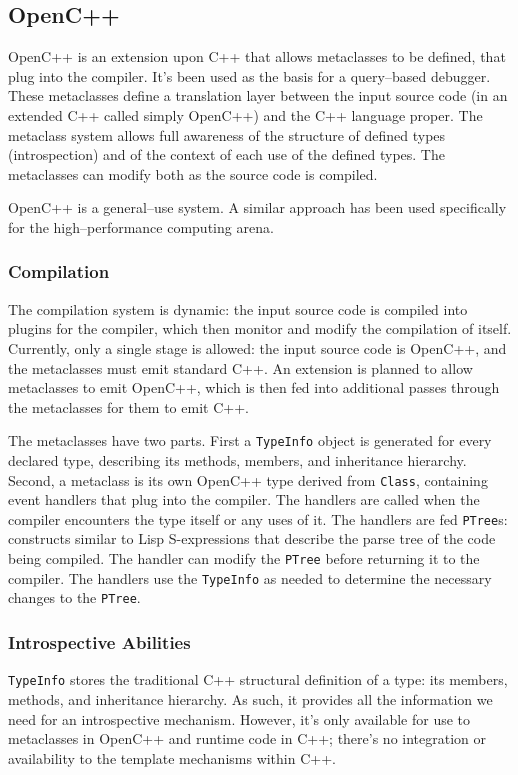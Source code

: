 \subsection{OpenC++}
	OpenC++\cite{chiba, opencpp, opencpp-tut} is an extension upon C++ that allows metaclasses to be defined, that plug into the compiler.  It's been used as the basis for a query--based debugger\cite{263752, 381750}.  These metaclasses define a translation layer between the input source code (in an extended C++ called simply OpenC++) and the C++ language proper.  The metaclass system allows full awareness of the structure of defined types (introspection) and of the context of each use of the defined types.  The metaclasses can modify both as the source code is compiled.

	OpenC++ is a general--use system.  A similar approach\cite{240738} has been used specifically for the high--performance computing arena.

	\subsubsection{Compilation}
	The compilation system is dynamic: the input source code is compiled into plugins for the compiler, which then monitor and modify the compilation of itself.  Currently, only a single stage is allowed: the input source code is OpenC++, and the metaclasses must emit standard C++.  An extension is planned to allow metaclasses to emit OpenC++, which is then fed into additional passes through the metaclasses for them to emit C++.

	The metaclasses have two parts.  First a \texttt{TypeInfo} object is generated for every declared type, describing its methods, members, and inheritance hierarchy.  Second, a metaclass is its own OpenC++ type derived from \texttt{Class}, containing event handlers that plug into the compiler.  The handlers are called when the compiler encounters the type itself or any uses of it.  The handlers are fed \texttt{PTree}s: constructs similar to Lisp S-expressions that describe the parse tree of the code being compiled.  The handler can modify the \texttt{PTree} before returning it to the compiler.  The handlers use the \texttt{TypeInfo} as needed to determine the necessary changes to the \texttt{PTree}.

	\subsubsection{Introspective Abilities}
	\texttt{TypeInfo} stores the traditional C++ structural definition of a type: its members, methods, and inheritance hierarchy.  As such, it provides all the information we need for an introspective mechanism.  However, it's only available for use to metaclasses in OpenC++ and runtime code in C++; there's no integration or availability to the template mechanisms within C++.
	
